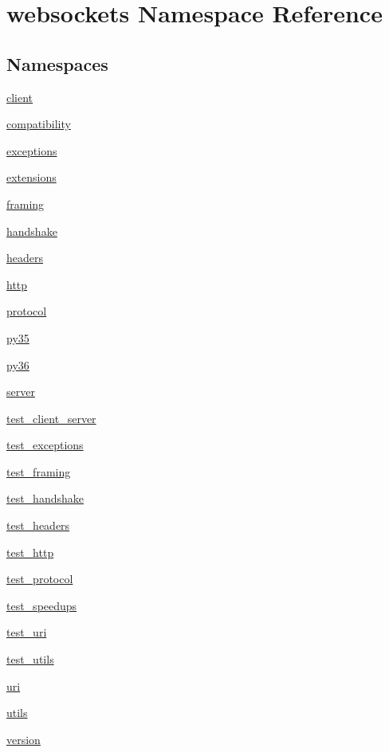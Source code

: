 \hypertarget{namespacewebsockets}{}\section{websockets Namespace Reference}
\label{namespacewebsockets}
\subsection*{Namespaces}
\begin{DoxyCompactItemize}
\item 
 \hyperlink{namespacewebsockets_1_1client}{client}
\item 
 \hyperlink{namespacewebsockets_1_1compatibility}{compatibility}
\item 
 \hyperlink{namespacewebsockets_1_1exceptions}{exceptions}
\item 
 \hyperlink{namespacewebsockets_1_1extensions}{extensions}
\item 
 \hyperlink{namespacewebsockets_1_1framing}{framing}
\item 
 \hyperlink{namespacewebsockets_1_1handshake}{handshake}
\item 
 \hyperlink{namespacewebsockets_1_1headers}{headers}
\item 
 \hyperlink{namespacewebsockets_1_1http}{http}
\item 
 \hyperlink{namespacewebsockets_1_1protocol}{protocol}
\item 
 \hyperlink{namespacewebsockets_1_1py35}{py35}
\item 
 \hyperlink{namespacewebsockets_1_1py36}{py36}
\item 
 \hyperlink{namespacewebsockets_1_1server}{server}
\item 
 \hyperlink{namespacewebsockets_1_1test__client__server}{test\+\_\+client\+\_\+server}
\item 
 \hyperlink{namespacewebsockets_1_1test__exceptions}{test\+\_\+exceptions}
\item 
 \hyperlink{namespacewebsockets_1_1test__framing}{test\+\_\+framing}
\item 
 \hyperlink{namespacewebsockets_1_1test__handshake}{test\+\_\+handshake}
\item 
 \hyperlink{namespacewebsockets_1_1test__headers}{test\+\_\+headers}
\item 
 \hyperlink{namespacewebsockets_1_1test__http}{test\+\_\+http}
\item 
 \hyperlink{namespacewebsockets_1_1test__protocol}{test\+\_\+protocol}
\item 
 \hyperlink{namespacewebsockets_1_1test__speedups}{test\+\_\+speedups}
\item 
 \hyperlink{namespacewebsockets_1_1test__uri}{test\+\_\+uri}
\item 
 \hyperlink{namespacewebsockets_1_1test__utils}{test\+\_\+utils}
\item 
 \hyperlink{namespacewebsockets_1_1uri}{uri}
\item 
 \hyperlink{namespacewebsockets_1_1utils}{utils}
\item 
 \hyperlink{namespacewebsockets_1_1version}{version}
\end{DoxyCompactItemize}
